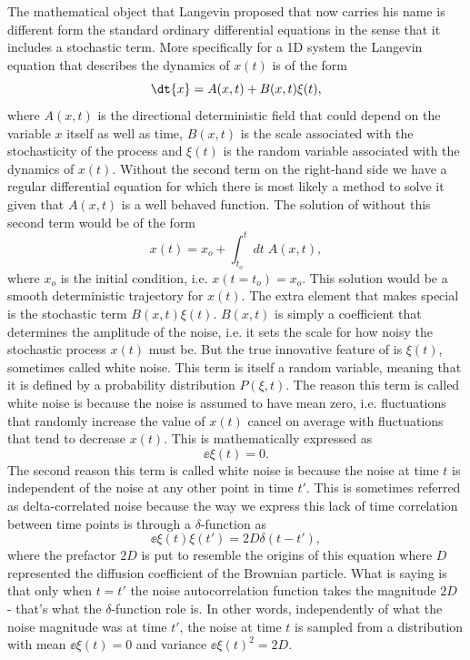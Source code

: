 The mathematical object that Langevin proposed that now carries his name is
different form the standard ordinary differential equations in the sense that
it includes a stochastic term. More specifically for a 1D system the Langevin
equation that describes the dynamics of $x(t)$ is of the form
\begin{equation}
  \dt{x} = A(x, t) + B(x, t) \xi(t),
  \label{eq_langevin}
\end{equation}
where $A(x, t)$ is the directional deterministic field that could depend on the
variable $x$ itself as well as time, $B(x, t)$ is the scale associated with the
stochasticity of the process and $\xi(t)$ is the random variable associated
with the dynamics of $x(t)$. Without the second term on the right-hand side we
have a regular differential equation for which there is most likely a method to
solve it given that $A(x, t)$ is a well behaved function. The solution of 
 without this second term would be of the form
\begin{equation}
  x(t) = x_o + \int_{t_o}^t dt\; A(x, t),
\end{equation}
where $x_o$ is the initial condition, i.e. $x(t = t_o) = x_o$. This solution
would be a smooth deterministic trajectory for $x(t)$. The extra element that
makes  special is the stochastic term $B(x, t) \xi(t)$. 
$B(x, t)$ is simply a coefficient that determines the amplitude of the noise,
i.e. it sets the scale for how noisy the stochastic process $x(t)$ must be. But
the true innovative feature of  is $\xi(t)$, sometimes called
white noise. This term is itself a random variable, meaning that it is defined
by a probability distribution $P(\xi, t)$. The reason this term is called white
noise is because the noise is assumed to have mean zero, i.e. fluctuations that
randomly increase the value of $x(t)$ cancel on average with fluctuations that
tend to decrease $x(t)$. This is mathematically expressed as
\begin{equation}
  \ee{\xi(t)} = 0.
\end{equation}
The second reason this term is called white noise is because the noise at time
$t$ is independent of the noise at any other point in time $t'$. This is
sometimes referred as delta-correlated noise because the way we express this
lack of time correlation between time points is through a $\delta$-function as
\begin{equation}
  \ee{\xi(t) \xi(t')} = 2D \delta(t - t'),
  \label{eq_noise_delta}
\end{equation}
where the prefactor $2D$ is put to resemble the origins of this equation where
$D$ represented the diffusion coefficient of the Brownian particle. What 
 is saying is that only when $t = t'$ the noise
autocorrelation function takes the magnitude $2D$ - that's what the 
$\delta$-function role is. In other words, independently of what the noise
magnitude was at time $t'$, the noise at time $t$ is sampled from a
distribution with mean $\ee{\xi(t)} = 0$ and variance $\ee{\xi(t)^2} = 2D$.

